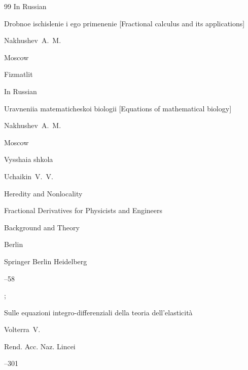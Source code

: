 \begin{thebibliography}{99}
\lang In Russian

\book Drobnoe ischislenie i ego primenenie \rm [Fractional calculus and its applications]

\by Nakhushev~A.~M.

\publaddr Moscow

\publ Fizmatlit






\lang In Russian

\book Uravneniia matematicheskoi biologii \rm [Equations of mathematical biology]

\by Nakhushev~A.~M.

\publaddr Moscow

\publ Vysshaia shkola






\by Uchaikin~V.~V.

\paper Heredity and Nonlocality

\inbook Fractional Derivatives for Physicists and Engineers


\volinfo Background and Theory

\publaddr Berlin

\publ Springer Berlin Heidelberg


--58

;






\paper Sulle equazioni integro-differenziali della teoria dell'elasticit\`a 

\by Volterra~V.

\jour Rend. Acc. Naz. Lincei



–301





\end{thebibliography}
